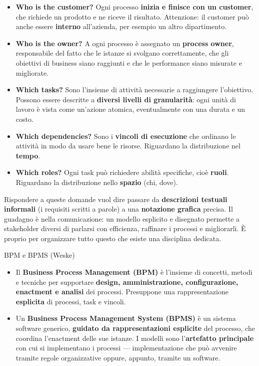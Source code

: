 \begin{itemize}
\item \textbf{Who is the customer?} Ogni processo \textbf{inizia e finisce con un customer}, che richiede un prodotto e ne riceve il risultato. Attenzione: il customer può anche essere \textbf{interno} all'azienda, per esempio un altro dipartimento.
\item \textbf{Who is the owner?} A ogni processo è assegnato un \textbf{process owner}, responsabile del fatto che le istanze si svolgano correttamente, che gli obiettivi di business siano raggiunti e che le performance siano misurate e migliorate.
\item \textbf{Which tasks?} Sono l'insieme di attività necessarie a raggiungere l'obiettivo. Possono essere descritte a \textbf{diversi livelli di granularità}: ogni unità di lavoro è vista come un'azione atomica, eventualmente con una durata e un costo.
\item \textbf{Which dependencies?} Sono i \textbf{vincoli di esecuzione} che ordinano le attività in modo da usare bene le risorse. Riguardano la distribuzione nel \textbf{tempo}.
\item \textbf{Which roles?} Ogni task può richiedere abilità specifiche, cioè \textbf{ruoli}. Riguardano la distribuzione nello \textbf{spazio} (chi, dove).
\end{itemize}

Rispondere a queste domande vuol dire passare da \textbf{descrizioni testuali informali} (i requisiti scritti a parole) a una \textbf{notazione grafica} precisa. Il guadagno è nella comunicazione: un modello esplicito e disegnato permette a stakeholder diversi di parlarsi con efficienza, raffinare i processi e migliorarli. È proprio per organizzare tutto questo che esiste una disciplina dedicata.

\begin{boxdefinition}{BPM e BPMS (Weske)}
\begin{itemize}
\item Il \textbf{Business Process Management (BPM)} è l'insieme di concetti, metodi e tecniche per supportare \textbf{design, amministrazione, configurazione, enactment e analisi} dei processi. Presuppone una rappresentazione \textbf{esplicita} di processi, task e vincoli.
\item Un \textbf{Business Process Management System (BPMS)} è un sistema software generico, \textbf{guidato da rappresentazioni esplicite} del processo, che coordina l'enactment delle sue istanze. I modelli sono l'\textbf{artefatto principale} con cui si implementano i processi — implementazione che può avvenire tramite regole organizzative oppure, appunto, tramite un software.
\end{itemize}
\end{boxdefinition}

